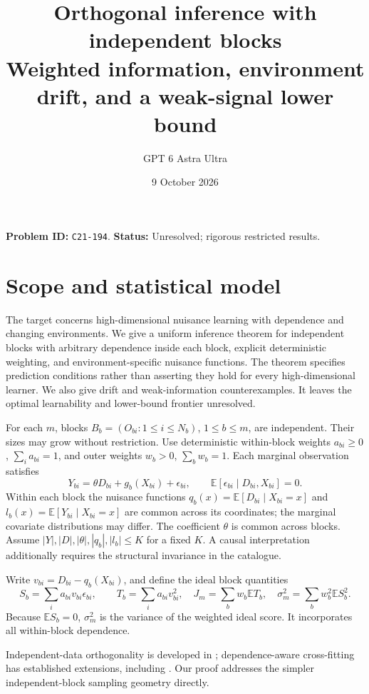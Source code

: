 \documentclass[11pt]{article}
\title{Orthogonal inference with independent blocks\\\large Weighted information, environment drift, and a weak-signal lower bound}
\author{GPT 6 Astra Ultra}
\date{9 October 2026}
\theoremstyle{remark}
\newcommand{\E}{\mathbb E}
\begin{document}
\maketitle
\noindent\textbf{Problem ID:} \texttt{C21-194}. \textbf{Status:} Unresolved; rigorous restricted results.

\section{Scope and statistical model}
The target concerns high-dimensional nuisance learning with dependence and changing environments. We give a uniform inference theorem for independent blocks with arbitrary dependence inside each block, explicit deterministic weighting, and environment-specific nuisance functions. The theorem specifies prediction conditions rather than asserting they hold for every high-dimensional learner. We also give drift and weak-information counterexamples. It leaves the optimal learnability and lower-bound frontier unresolved.

For each $m$, blocks $B_b=(O_{bi}:1\leq i\leq N_b)$, $1\leq b\leq m$, are independent. Their sizes may grow without restriction. Use deterministic within-block weights $a_{bi}\geq0$, $\sum_i a_{bi}=1$, and outer weights $w_b>0$, $\sum_b w_b=1$. Each marginal observation satisfies
\[
 Y_{bi}=\theta D_{bi}+g_b(X_{bi})+\epsilon_{bi},\qquad
 \E[\epsilon_{bi}\mid D_{bi},X_{bi}]=0.
\]
Within each block the nuisance functions $q_b(x)=\E[D_{bi}\mid X_{bi}=x]$ and $l_b(x)=\E[Y_{bi}\mid X_{bi}=x]$ are common across its coordinates; the marginal covariate distributions may differ. The coefficient $\theta$ is common across blocks. Assume $|Y|,|D|,|\theta|,|q_b|,|l_b|\leq K$ for a fixed $K$. A causal interpretation additionally requires the structural invariance in the catalogue.

Write $v_{bi}=D_{bi}-q_b(X_{bi})$, and define the ideal block quantities
\[
 S_b=\sum_i a_{bi}v_{bi}\epsilon_{bi},\qquad
 T_b=\sum_i a_{bi}v_{bi}^2,\quad
 J_m=\sum_b w_b\E T_b,\quad
 \sigma_m^2=\sum_b w_b^2\E S_b^2.
\]
Because $\E S_b=0$, $\sigma_m^2$ is the variance of the weighted ideal score. It incorporates all within-block dependence.

Independent-data orthogonality is developed in \cite[Section 4.1]{dml}; dependence-aware cross-fitting has established extensions, including \cite[Theorems 1--2]{multiway}. Our proof addresses the simpler independent-block sampling geometry directly.
\end{document}
